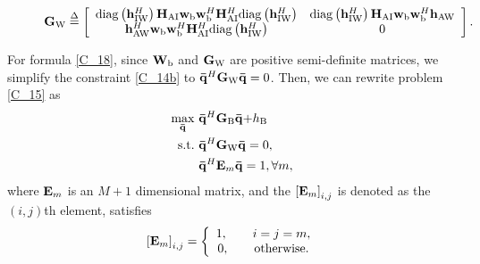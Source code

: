 \documentclass[10pt,journal,letterpaper,twocolumn,twoside]{IEEEtran} %
\begin{document}
 \begin{figure*}[pt]
 \begin{align}\label{GW}
{{\bf{G}}_{\rm{W}}} \buildrel \Delta \over = \left[ {\begin{array}{*{20}{c}}
{{\rm{diag}}\left( {{\bf{h}}_{{\rm{IW}}}^H} \right){{\bf{H}}_{{\rm{AI}}}}{{\bf{w}}_{\rm{b}}}{\bf{w}}_{\rm{b}}^H{\bf{H}}_{{\rm{AI}}}^H{\rm{diag}}\left( {{\bf{h}}_{{\rm{IW}}}^H} \right)}&{{\rm{diag}}\left( {{\bf{h}}_{{\rm{IW}}}^H} \right){{\bf{H}}_{{\rm{AI}}}}{{\bf{w}}_{\rm{b}}}{\bf{w}}_{\rm{b}}^H{{\bf{h}}_{{\rm{AW}}}}}\\
{{\bf{h}}_{{\rm{AW}}}^H{{\bf{w}}_{\rm{b}}}{\bf{w}}_{\rm{b}}^H{\bf{H}}_{{\rm{AI}}}^H{\rm{diag}}\left( {{\bf{h}}_{{\rm{IW}}}^H} \right)}&0
\end{array}} \right].
 \end{align}
 \hrulefill
 \end{figure*}

For formula \eqref{C_18},  since ${\bf{W}}_{\rm{b}}$ and ${{\bf{G}}_{\rm{W}}}$ are positive semi-definite matrices,  we simplify the constraint \eqref{C_14b}  to  ${{{\bf{\bar q}}}^H}{{\bf{G}}_{\rm{W}}}{\bf{\bar q}}=0$.
Then, we can rewrite problem \eqref{C_15}  as
    \begin{subequations}\label{problem1}
\begin{align}
 \mathop {\max }\limits_{{{\bf{\bar q}}}} ~&{{{{{\bf{\bar q}}}^H}{{\bf{G}}_{\rm{B}}}{\bf{\bar q}}{\rm{ + }}{h_{\rm{B}}}}}\\
 {\rm{s.t.}}~&{{{\bf{\bar q}}}^H}{{\bf{G}}_{\rm{W}}}{\bf{\bar q}}=0,\\
 &{{{\bf{\bar q}}}^H}{{\bf{E}}_{{m}}}{\bf{\bar q}}=1,\forall m,
 \end{align}
\end{subequations}
where ${{\bf{E}}_{{m}}}$ is an $M+1$ dimensional matrix, and the ${\left[ {{{\bf{E}}_m}} \right]_{i,j}}$ is denoted
as the $\left( {i,j} \right)$th element, satisfies
\begin{align}
{\left[ {{{\bf{E}}_m}} \right]_{i,j}} = \left\{ {\begin{array}{*{20}{c}}
{1,\begin{array}{*{20}{c}}
{}&{}
\end{array}i = j = m,}\\
{0,\begin{array}{*{20}{c}}
{}&{}
\end{array}{\rm {otherwise.}}}
\end{array}} \right.
 \end{align}
\end{document}
